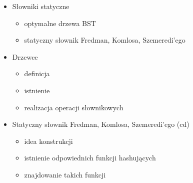 \begin{itemize}
\item Słowniki statyczne
\begin{itemize}
	\item optymalne drzewa BST
	\item statyczny słownik Fredman, Komlosa, Szemeredi'ego
\end{itemize}

\item{Drzewce}
\begin{itemize}
	\item definicja
	\item istnienie
	\item realizacja operacji słownikowych
\end{itemize}


\item Statyczny słownik Fredman, Komlosa, Szemeredi'ego (cd)
\begin{itemize}
	\item idea konstrukcji
	\item istnienie odpowiednich funkcji hashujących
	\item znajdowanie takich funkcji
\end{itemize}


\end{itemize}